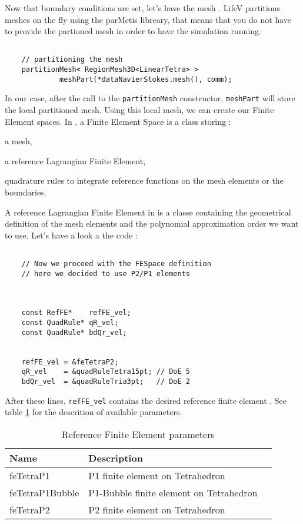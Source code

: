 {Now that boundary conditions are set, let's have the mesh . LifeV partitions meshes on the fly
using the parMetis libreary, that means that you do not have to provide the partioned mesh in
order to have the simulation running.

\begin{verbatim}

    // partitioning the mesh
    partitionMesh< RegionMesh3D<LinearTetra> >
             meshPart(*dataNavierStokes.mesh(), comm);

\end{verbatim}

In our case, after the call to the \verb!partitionMesh! constructor, \verb!meshPart! will store
the local partitioned mesh. Using this local mesh, we can create our Finite Element  spaces.
In \lifev, a Finite Element Space is a class storing :
\begin{description}
\item a mesh,
\item a reference Lagrangian Finite Element,
\item quadrature rules to integrate reference functions on the mesh elements or the boundaries.
\end{description}
A reference Lagrangian Finite Element in \lifev is a classe containing the geometrical definition
of the mesh elements and the polynomial approximation order we want to use.
Let's have a look a the code :

\begin{verbatim}

    // Now we proceed with the FESpace definition
    // here we decided to use P2/P1 elements



    const RefFE*    refFE_vel;
    const QuadRule* qR_vel;
    const QuadRule* bdQr_vel;


    refFE_vel = &feTetraP2;
    qR_vel    = &quadRuleTetra15pt; // DoE 5
    bdQr_vel  = &quadRuleTria3pt;   // DoE 2

\end{verbatim}

After these lines, \verb!refFE_vel! contains the desired reference finite element  . See table \ref{table-feapproxorder}
for the descrition of available parameters.

\begin{table}
\begin{center}
\begin{tabular}{|l|l|l|}
\hline
Name  & Description \\
\hline \hline
feTetraP1 & P1 finite element on Tetrahedron \\
feTetraP1Bubble & P1-Bubble finite element on Tetrahedron \\
feTetraP2 & P2 finite element on Tetrahedron \\
\hline
\end{tabular}
\end{center}
\caption{ Reference Finite Element parameters}
\label{table-feapproxorder}
\end{table}

}
